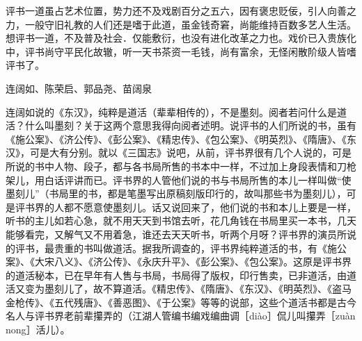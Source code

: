\documentclass[12pt,UTF8]{ctexbook}
\begin{document}
评书一道虽占艺术位置，势力还不及戏剧百分之五六，因有褒忠贬佞，引人向善之力，一般守旧礼教的人们还是嗜于此道，虽金钱奇窘，尚能维持百数多艺人生活。想评书一道，不及普及社会．仅能敷衍，也没有进化改革之力也。戏价已入贵族化中，评书尚守平民化故辙，听一天书茶资一毛钱，尚有富余，无怪闲散阶级人皆嗜评书了。





连阔如、陈荣启、郭品尧、苗阔泉


连阔如说的《东汉》，纯粹是道活（辈辈相传的），不是墨刻。阅者若问什么是道活？什么叫墨刻？关于这两个意思我得向阅者述明。说评书的人们所说的书，虽有《施公案》、《济公传》、《彭公案》、《精忠传》、《包公案》、《明英烈》、《隋唐》、《东汉》，可是大有分别。就以《三国志》说吧，从前，评书界很有几个人说的，可是所说的书中人物、段子，都与各书局所售的书本中一样，不过加上身段表情和刀枪架儿，用白话评讲而已。评书界的人管他们说的书与书局所售的本儿一样叫做“使墨刻儿”（书局里的书，都是笔墨写出原稿刻版印行的，故叫那些书为墨刻儿），可是评书界的人都不愿意使墨刻儿。话又说回来了，他们说的书和本儿上要是一样，听书的主儿如若心急，就不用天天到书馆去听，花几角钱在书局里买一本书，几天能够看完，又解气又不用着急，谁还去天天听书，听两个月呀？评书界的演员所说的评书，最贵重的书叫做道活。据我所调查的，评书界纯粹道活的书，有《施公案》、《大宋八义》、《济公传》、《永庆升平》、《彭公案》、《包公案》。这原是评书界的道活秘本，已在早年有人售与书局，书局得了版权，印行售卖，已非道活，由道活又变为墨刻儿了，故不算道活。《精忠传》、《隋唐》、《东汉》、《明英烈》、《盗马金枪传》、《五代残唐》、《善恶图》、《于公案》等等的说部，这些个道活书都是古今名人与评书界老前辈攥弄的（江湖人管编书编戏编曲调［diào］侃儿叫攥弄［zuàn nong］活儿）。
\end{document}
